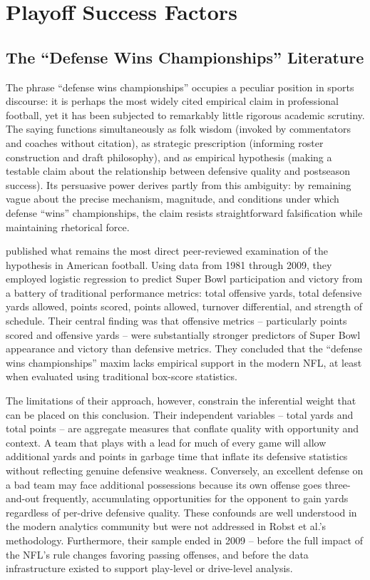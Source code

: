 \section{Playoff Success Factors}
\label{sec:playoff-factors}

\subsection{The ``Defense Wins Championships'' Literature}
\label{sec:dwc-literature}

The phrase ``defense wins championships'' occupies a peculiar position in sports discourse: it is perhaps the most widely cited empirical claim in professional football, yet it has been subjected to remarkably little rigorous academic scrutiny. The saying functions simultaneously as folk wisdom (invoked by commentators and coaches without citation), as strategic prescription (informing roster construction and draft philosophy), and as empirical hypothesis (making a testable claim about the relationship between defensive quality and postseason success). Its persuasive power derives partly from this ambiguity: by remaining vague about the precise mechanism, magnitude, and conditions under which defense ``wins'' championships, the claim resists straightforward falsification while maintaining rhetorical force.

\textcite{robst2011defense} published what remains the most direct peer-reviewed examination of the hypothesis in American football. Using data from 1981 through 2009, they employed logistic regression to predict Super Bowl participation and victory from a battery of traditional performance metrics: total offensive yards, total defensive yards allowed, points scored, points allowed, turnover differential, and strength of schedule. Their central finding was that offensive metrics  -- particularly points scored and offensive yards  -- were substantially stronger predictors of Super Bowl appearance and victory than defensive metrics. They concluded that the ``defense wins championships'' maxim lacks empirical support in the modern NFL, at least when evaluated using traditional box-score statistics.

The limitations of their approach, however, constrain the inferential weight that can be placed on this conclusion. Their independent variables  -- total yards and total points  -- are aggregate measures that conflate quality with opportunity and context. A team that plays with a lead for much of every game will allow additional yards and points in garbage time that inflate its defensive statistics without reflecting genuine defensive weakness. Conversely, an excellent defense on a bad team may face additional possessions because its own offense goes three-and-out frequently, accumulating opportunities for the opponent to gain yards regardless of per-drive defensive quality. These confounds are well understood in the modern analytics community but were not addressed in Robst et al.'s methodology. Furthermore, their sample ended in 2009  -- before the full impact of the NFL's rule changes favoring passing offenses, and before the data infrastructure existed to support play-level or drive-level analysis.

